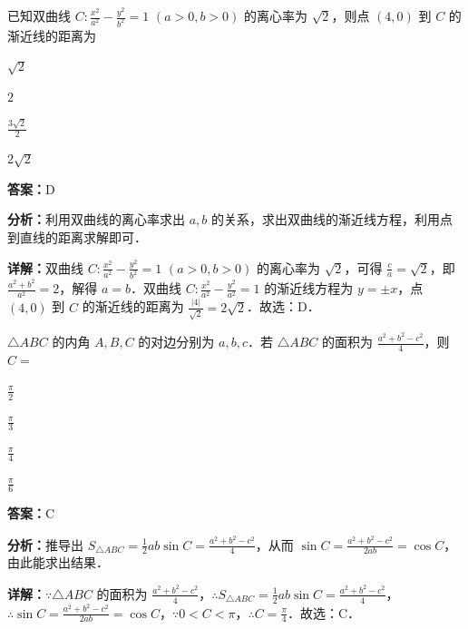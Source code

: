 \begin{question}[points=5]
已知双曲线 $C: \frac{x^2}{a^2}-\frac{y^2}{b^2}=1$ $ (a>0,b>0)$ 的离心率为 $\sqrt{2}$，则点 $(4,0)$ 到 $C$ 的渐近线的距离为
\begin{choices}
  \item $\sqrt{2}$
  \item $2$
  \item $\frac{3\sqrt{2}}{2}$
  \item $2\sqrt{2}$
\end{choices}
\begin{solution}
\textbf{答案：}D

\textbf{分析：}利用双曲线的离心率求出 $a,b$ 的关系，求出双曲线的渐近线方程，利用点到直线的距离求解即可．

\textbf{详解：}双曲线 $C: \frac{x^2}{a^2}-\frac{y^2}{b^2}=1$ $(a>0,b>0)$ 的离心率为 $\sqrt{2}$，可得 $\frac{c}{a}=\sqrt{2}$，即 $\frac{a^2+b^2}{a^2}=2$，解得 $a=b$．双曲线 $C: \frac{x^2}{a^2}-\frac{y^2}{a^2}=1$ 的渐近线方程为 $y=\pm x$，点 $(4,0)$ 到 $C$ 的渐近线的距离为 $\frac{|4|}{\sqrt{2}}=2\sqrt{2}$．故选：D．
\end{solution}
\end{question}

\begin{question}[points=5]
$\triangle ABC$ 的内角 $A,B,C$ 的对边分别为 $a,b,c$．若 $\triangle ABC$ 的面积为 $\frac{a^2+b^2-c^2}{4}$，则 $C=$
\begin{choices}
  \item $\frac{\pi}{2}$
  \item $\frac{\pi}{3}$
  \item $\frac{\pi}{4}$
  \item $\frac{\pi}{6}$
\end{choices}
\begin{solution}
\textbf{答案：}C

\textbf{分析：}推导出 $S_{\triangle ABC}= \frac{1}{2}ab\sin C = \frac{a^2+b^2-c^2}{4}$，从而 $\sin C = \frac{a^2+b^2-c^2}{2ab} = \cos C$，由此能求出结果．

\textbf{详解：}$\because \triangle ABC$ 的面积为 $\frac{a^2+b^2-c^2}{4}$，$\therefore S_{\triangle ABC}= \frac{1}{2}ab\sin C = \frac{a^2+b^2-c^2}{4}$，$\therefore \sin C = \frac{a^2+b^2-c^2}{2ab} = \cos C$，$\because 0<C<\pi$，$\therefore C=\frac{\pi}{4}$．故选：C．
\end{solution}
\end{question}

